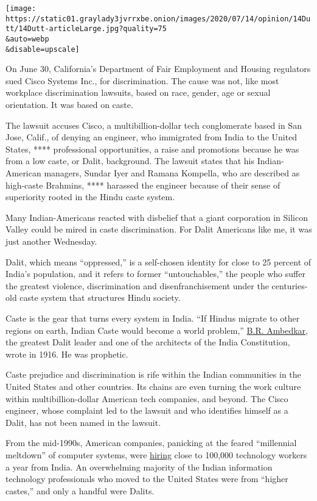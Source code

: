 \texttt{[image: https://static01.graylady3jvrrxbe.onion/images/2020/07/14/opinion/14Dutt/14Dutt-articleLarge.jpg?quality=75\\\&auto=webp\\\&disable=upscale]}

On June 30, California's Department of Fair Employment and Housing
regulators sued Cisco Systems Inc., for discrimination. The cause was
not, like most workplace discrimination lawsuits, based on race, gender,
age or sexual orientation. It was based on caste.

The lawsuit accuses Cisco, a multibillion-dollar tech conglomerate based
in San Jose, Calif., of denying an engineer, who immigrated from India
to the United States, **** professional opportunities, a raise and
promotions because he was from a low caste, or Dalit, background. The
lawsuit states that his Indian-American managers, Sundar Iyer and Ramana
Kompella, who are described as high-caste Brahmins, **** harassed the
engineer because of their sense of superiority rooted in the Hindu caste
system.

Many Indian-Americans reacted with disbelief that a giant corporation in
Silicon Valley could be mired in caste discrimination. For Dalit
Americans like me, it was just another Wednesday.

Dalit, which means ``oppressed,'' is a self-chosen identity for close to
25 percent of India's population, and it refers to former
``untouchables,'' the people who suffer the greatest violence,
discrimination and disenfranchisement under the centuries-old caste
system that structures Hindu society.

Caste is the gear that turns every system in India. ``If Hindus migrate
to other regions on earth, Indian Caste would become a world problem,''
\href{http://www.columbia.edu/itc/mealac/pritchett/00ambedkar/txt_ambedkar_castes.html}{B.R.
Ambedkar}, the greatest Dalit leader and one of the architects of the
India Constitution, wrote in 1916. He was prophetic.

Caste prejudice and discrimination is rife within the Indian communities
in the United States and other countries. Its chains are even turning
the work culture within multibillion-dollar American tech companies, and
beyond. The Cisco engineer, whose complaint led to the lawsuit and who
identifies himself as a Dalit, has not been named in the lawsuit.

From the mid-1990s, American companies, panicking at the feared
``millennial meltdown'' of computer systems, were
\href{https://www8.gsb.columbia.edu/articles/chazen-global-insights/singular-population-indian-immigrants-america}{hiring}
close to 100,000 technology workers a year from India. An overwhelming
majority of the Indian information technology professionals who moved to
the United States were from ``higher castes,'' and only a handful were
Dalits.

